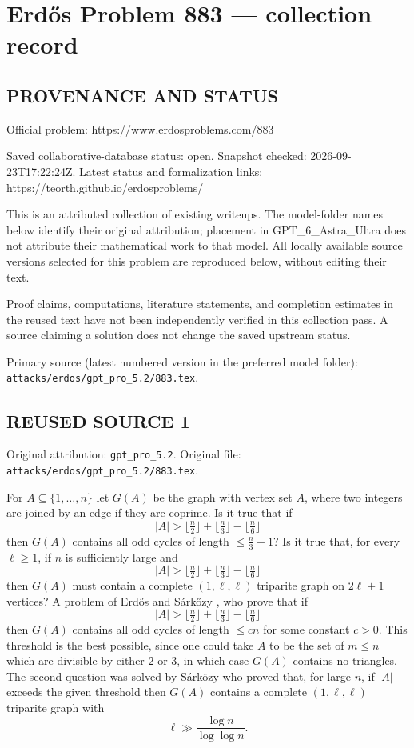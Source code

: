 \section*{Erd\H{o}s Problem 883 --- collection record}

\subsection*{PROVENANCE AND STATUS}
Official problem: https://www.erdosproblems.com/883

Saved collaborative-database status: open.
Snapshot checked: 2026-09-23T17:22:24Z.
Latest status and formalization links: https://teorth.github.io/erdosproblems/

This is an attributed collection of existing writeups. The model-folder names below identify their original attribution; placement in GPT\_6\_Astra\_Ultra does not attribute their mathematical work to that model. All locally available source versions selected for this problem are reproduced below, without editing their text.

Proof claims, computations, literature statements, and completion estimates in the reused text have not been independently verified in this collection pass. A source claiming a solution does not change the saved upstream status.

Primary source (latest numbered version in the preferred model folder): \texttt{attacks/erdos/gpt\_pro\_5.2/883.tex}.

\subsection*{REUSED SOURCE 1}
Original attribution: \texttt{gpt\_pro\_5.2}.
Original file: \texttt{attacks/erdos/gpt\_pro\_5.2/883.tex}.


For $A\subseteq \{1,\ldots,n\}$ let $G(A)$ be the graph with vertex set $A$, where two integers are joined by an edge if they are coprime. Is it true that if\[\lvert A\rvert >\lfloor\tfrac{n}{2}\rfloor+\lfloor\tfrac{n}{3}\rfloor-\lfloor\tfrac{n}{6}\rfloor\]then $G(A)$ contains all odd cycles of length $\leq \frac{n}{3}+1$? Is it true that, for every $\ell\geq 1$, if $n$ is sufficiently large and\[\lvert A\rvert >\lfloor\tfrac{n}{2}\rfloor+\lfloor\tfrac{n}{3}\rfloor-\lfloor\tfrac{n}{6}\rfloor\]then $G(A)$ must contain a complete $(1,\ell,\ell)$ triparite graph on $2\ell+1$ vertices? A problem of Erd\H{o}s and S\'{a}rk\H{o}zy \cite{ErSa97}, who prove that if\[\lvert A\rvert >\lfloor\tfrac{n}{2}\rfloor+\lfloor\tfrac{n}{3}\rfloor-\lfloor\tfrac{n}{6}\rfloor\]then $G(A)$ contains all odd cycles of length $\leq cn$ for some constant $c>0$. This threshold is the best possible, since one could take $A$ to be the set of $m\leq n$ which are divisible by either $2$ or $3$, in which case $G(A)$ contains no triangles. The second question was solved by S\'{a}rk\"{o}zy \cite{Sa99} who proved that, for large $n$, if $\lvert A\rvert$ exceeds the given threshold then $G(A)$ contains a complete $(1,\ell,\ell)$ triparite graph with\[\ell \gg \frac{\log n}{\log\log n}.\]

